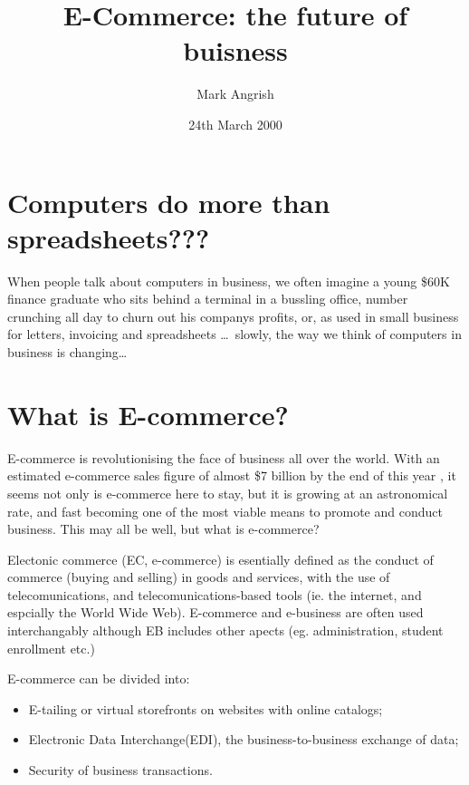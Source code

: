 \documentclass{article}      %
\title{E-Commerce: the future of buisness}  %
\author{Mark Angrish}      %
\date{24th March 2000}     %
\begin{document}

\maketitle                   %


\section{Computers do more than spreadsheets???}      

When people talk about computers in business, we often imagine a young
\$60K finance graduate who sits behind a terminal in a bussling office,
number crunching all day to churn out his companys profits, or, as used in
small business for letters, invoicing and spreadsheets \ldots\ slowly, the way 
we think of computers in business is changing\ldots\


\section{What is E-commerce?}

E-commerce is revolutionising the face of business all over the world.  With
an estimated e-commerce sales figure of almost \$7 billion by the end of this year\cite{Vkn:url}
, it seems not only is e-commerce here to stay, but it is
growing at an astronomical rate, and fast becoming one of the most viable means to 
promote and conduct business.  This may all be well, but what is e-commerce?

Electonic commerce (EC, e-commerce) is esentially defined as the conduct of commerce
(buying and selling) in goods and services, with the use of telecomunications, and 
telecomunications-based tools (ie. the internet, and espcially the World Wide Web)\cite{Clarke:url}.
E-commerce and e-business are often used interchangably although EB includes other
apects (eg. administration, student enrollment etc.)

E-commerce can be divided into:
\begin{itemize}
	\item E-tailing or virtual storefronts on websites with online catalogs;
	\item Electronic Data Interchange(EDI), the business-to-business exchange of data;
	\item Security of business transactions.
\end{itemize}
\end{document}
